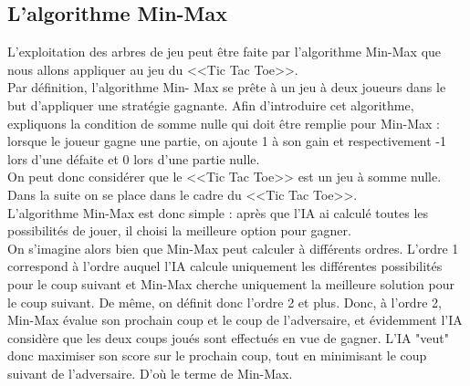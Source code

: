 \documentclass{article}
\begin{document}

\subsection{L'algorithme Min-Max}

L'exploitation des arbres de jeu peut être faite par l'algorithme Min-Max 
que nous allons appliquer au jeu du <<Tic Tac Toe>>. \\

Par définition, l'algorithme Min-
Max se prête à un jeu à deux joueurs dans le but d'appliquer une stratégie
gagnante. 
Afin d'introduire cet algorithme, expliquons la condition de somme nulle qui
doit être remplie pour Min-Max : 
lorsque le joueur gagne une partie, on ajoute 1 à son gain et respectivement -1
lors 
d'une défaite et 0 lors d'une partie nulle. \\

On peut donc considérer que le <<Tic Tac Toe>> est un jeu à somme nulle.
Dans la suite on se place dans le cadre du <<Tic Tac Toe>>. \\

L'algorithme Min-Max est donc simple : après que l'IA ai calculé toutes les
possibilités de jouer,
 il choisi la meilleure option pour gagner. \\

On s'imagine alors bien que Min-Max peut calculer à différents ordres. L'ordre 1
correspond à l'ordre auquel 
l'IA calcule uniquement les différentes possibilités pour le coup suivant et
Min-Max cherche uniquement 
la meilleure solution pour le coup suivant. De même, on définit donc l'ordre 2
et plus.
Donc, à l'ordre 2, Min-Max évalue son prochain coup et le coup de l'adversaire,
et évidemment 
l'IA considère que les deux coups joués sont effectués en vue de gagner. L'IA
"veut" donc 
maximiser son score sur le prochain coup, tout en minimisant le coup suivant de
l'adversaire.
D'où le terme de Min-Max.
\end{document}
